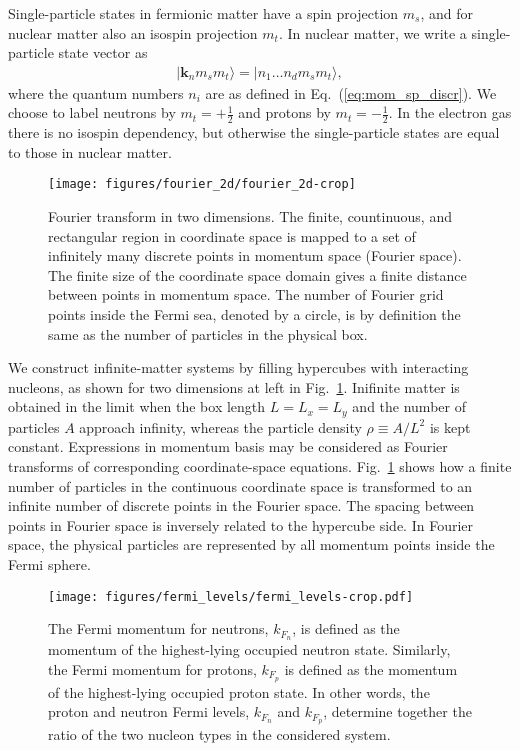 \documentclass[a4paper,12pt]{report}
\begin{document}
Single-particle states in fermionic matter have a spin projection $m_{s}$, and for nuclear matter also an isospin projection $m_{t}$. In nuclear matter, we write a single-particle state vector as 
\begin{align} \label{eq:sp_mom_cart}
  |\mathbf{k}_{n} m_{s}m_{t}\rangle = |n_{1}\dots n_{d}m_{s}m_{t}\rangle , 
\end{align}
where the quantum numbers $n_{i}$ are as defined in Eq.~(\ref{eq:mom_sp_discr}). We choose to label neutrons by $m_{t} = +\frac{1}{2}$ and protons by $m_{t} = -\frac{1}{2}$. In the electron gas there is no isospin dependency, but otherwise 
the single-particle states are equal to those in nuclear matter.   

\begin{figure} 
  \centering
  \texttt{[image: figures/fourier\_2d/fourier\_2d-crop]}
  \caption{Fourier transform in two dimensions. The finite, countinuous, and rectangular region in coordinate space is mapped to a set of infinitely many discrete points in momentum space (Fourier space). The finite size of the coordinate space domain gives a finite distance between points in momentum space. The number of Fourier grid points inside the Fermi sea, denoted by a circle, is by definition the same as the number of particles in the physical box.}
  \label{fig:fourier_2d}
\end{figure}

We construct infinite-matter systems by filling hypercubes with 
interacting nucleons, as shown for two dimensions at left in 
Fig.~\ref{fig:fourier_2d}. Inifinite matter is obtained in the limit 
when the box length $L = L_{x} = L_{y}$ and the number of particles $A$ 
approach infinity, whereas the particle density $\rho \equiv A/L^{2}$ is 
kept constant. Expressions in momentum basis may be considered as 
Fourier transforms of corresponding coordinate-space equations. 
Fig.~\ref{fig:fourier_2d} shows how a finite number of particles
in the continuous coordinate space is transformed to an infinite number
of discrete points in the Fourier space. The spacing between points
in Fourier space is inversely related to the hypercube side.
In Fourier space, the physical particles are represented by all momentum
points inside the Fermi sphere.

\begin{figure} 
  \centering
  \texttt{[image: figures/fermi\_levels/fermi\_levels-crop.pdf]}
  \caption{The Fermi momentum for neutrons, $k_{F_{n}}$, is defined as the momentum of the highest-lying occupied neutron state. Similarly, the Fermi momentum for protons, $k_{F_{p}}$ is defined as the momentum of the highest-lying occupied proton state. In other words, the proton and neutron Fermi levels, $k_{F_{n}}$ and $k_{F_{p}}$, determine together the ratio of the two nucleon types in the considered system.}
  \label{fig:fermi_levels}
\end{figure}
\end{document}
